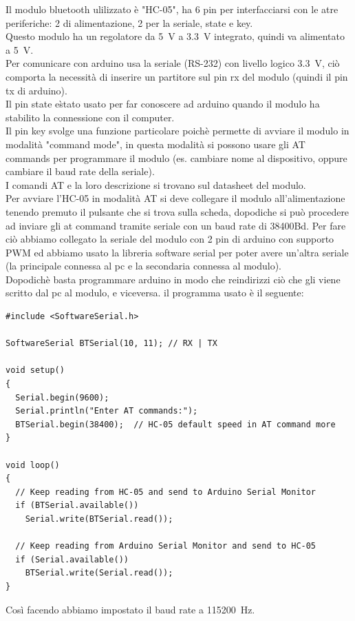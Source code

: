 \documentclass[10pt,a4paper]{article}
\begin{document}
Il modulo bluetooth ulilizzato \`e "HC-05", ha 6 pin per interfacciarsi con le atre periferiche: 2 di alimentazione, 2 per la seriale, state e key. 
\\
Questo modulo ha un regolatore da \SI{5}{\volt} a \SI{3.3}{\volt} integrato, quindi va alimentato a \SI{5}{\volt}.
\\
Per comunicare con arduino usa la seriale (RS-232) con livello logico \SI{3.3}{\volt}, ci\`o comporta la necessit\`a di inserire un partitore sul pin rx del modulo (quindi il pin tx di arduino). 
\\
Il pin state e\` stato usato per far conoscere ad arduino quando il modulo ha stabilito la connessione con il computer. 
\\
Il pin key svolge una funzione particolare poich\`e permette di avviare il modulo in modalit\`a "command mode", in questa modalit\`a si possono usare gli AT commands per programmare il modulo (es. cambiare nome al dispositivo, oppure cambiare il baud rate della seriale).
\\
I comandi AT e la loro descrizione si trovano sul datasheet del modulo. 
\\
Per avviare l'HC-05 in modalit\`a AT si deve collegare il modulo all'alimentazione tenendo premuto il pulsante che si trova sulla scheda, dopodiche si pu\`o procedere ad inviare gli at command tramite seriale con un baud rate di 38400Bd. Per fare ci\`o abbiamo collegato la seriale del modulo con 2  pin di arduino con supporto PWM ed abbiamo usato la libreria software serial per poter avere un'altra seriale (la principale connessa al pc e la secondaria connessa al modulo). 
\\
Dopodich\`e basta programmare arduino in modo che reindirizzi ci\`o che gli viene scritto dal pc al modulo, e viceversa. il programma usato \`e il seguente:
%
\begin{lstlisting}[style=myArduino]
#include <SoftwareSerial.h>

SoftwareSerial BTSerial(10, 11); // RX | TX

void setup()
{
  Serial.begin(9600);
  Serial.println("Enter AT commands:");
  BTSerial.begin(38400);  // HC-05 default speed in AT command more
}

void loop()
{
  // Keep reading from HC-05 and send to Arduino Serial Monitor
  if (BTSerial.available())
    Serial.write(BTSerial.read());

  // Keep reading from Arduino Serial Monitor and send to HC-05
  if (Serial.available())
    BTSerial.write(Serial.read());
}
\end{lstlisting}
Cos\`i facendo abbiamo impostato il baud rate a \SI{115200}{\hertz}.
\end{document}
